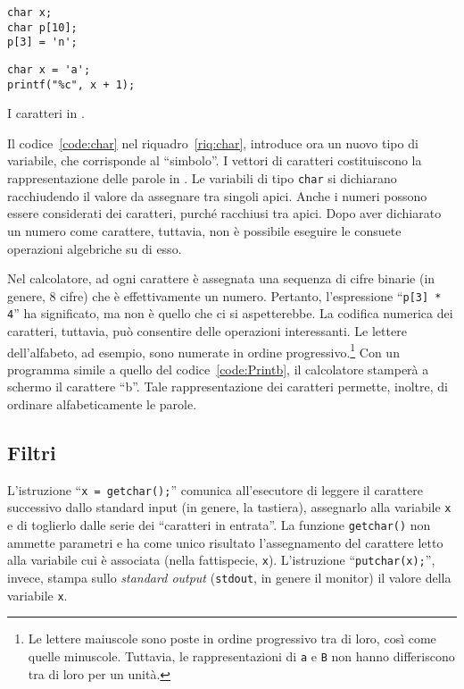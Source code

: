 \begin{code}
\begin{minipage}{0.45\columnwidth}
	\begin{lstlisting}[caption={\em Il tipo \lstinline!char!.},nolol,label={code:char}]
char x;
char p[10];
p[3] = 'n';
	\end{lstlisting}
\end{minipage}	\hfill
\begin{minipage}{0.45\columnwidth}
	\begin{lstlisting}[caption={\ },nolol,label={code:Printb}]
char x = 'a';
printf("%c", x + 1);
	\end{lstlisting}
\end{minipage}
\caption{I caratteri in .}
\label{riq:char}
\end{code}
Il codice~\ref{code:char} nel riquadro~\ref{riq:char}, introduce ora un nuovo tipo di variabile, che corrisponde al “simbolo”.
I vettori di caratteri costituiscono la rappresentazione delle parole in . 
Le variabili di tipo \lstinline!char! si dichiarano racchiudendo il valore da assegnare tra singoli apici. Anche i numeri possono essere considerati dei caratteri, purché racchiusi tra apici.
Dopo aver dichiarato un numero come carattere, tuttavia, non è possibile eseguire le consuete operazioni algebriche su di esso.

Nel  calcolatore, ad ogni carattere è assegnata una sequenza di cifre binarie (in genere, \num{8} cifre) che è effettivamente un numero.
Pertanto, l'espressione ``\lstinline!p[3] * 4!'' ha significato, ma non è quello che ci si aspetterebbe.
La codifica numerica dei caratteri, tuttavia, può consentire delle operazioni interessanti.
Le lettere dell'alfabeto, ad esempio, sono numerate in ordine progressivo.\footnote{Le lettere maiuscole sono poste in ordine progressivo tra di loro, così come quelle minuscole. Tuttavia, le rappresentazioni di \lstinline!a! e \lstinline!B! non hanno differiscono tra di loro per un unità.}
Con un programma simile a quello del codice~\ref{code:Printb}, il calcolatore stamperà a schermo il carattere ``b''.
Tale rappresentazione dei caratteri permette, inoltre, di ordinare alfabeticamente le parole.

		\subsection{Filtri}
L'istruzione ``\lstinline!x = getchar();!'' comunica all'esecutore di leggere il carattere successivo dallo standard input (in genere, la tastiera), assegnarlo alla variabile \lstinline!x! e di toglierlo dalle serie dei ``caratteri in entrata''.
La funzione \lstinline!getchar()! non ammette parametri e ha come unico risultato l'assegnamento del carattere letto alla variabile cui è associata (nella fattispecie, \lstinline!x!).
L'istruzione ``\lstinline!putchar(x);!'', invece, stampa sullo \emph{standard output} (\lstinline!stdout!, in genere il monitor) il valore della variabile \lstinline!x!.


